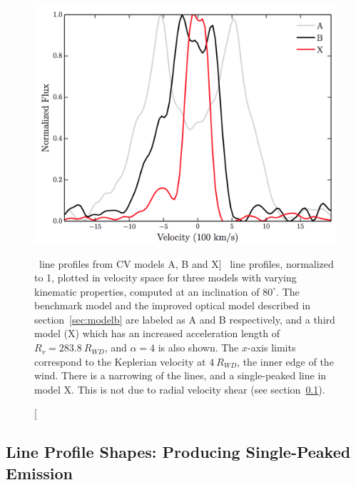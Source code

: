 \begin{figure}
\centering
\includegraphics[width=1.0\textwidth]{figures/05-cvpaper/mc.png}
\caption
[\ha\ line profiles from CV models A, B and X]
{
\ha\ line profiles, normalized to 1, plotted in velocity space 
for three models with varying kinematic 
properties, computed at an inclination of $80^\circ$.
The benchmark model and the improved optical
model described in section~\ref{sec:modelb} are labeled as A and B respectively,
and a third model (X) which has an increased acceleration length of 
$R_v = 283.8~R_{WD}$, and $\alpha=4$ is also shown. 
The $x$-axis limits correspond to the Keplerian velocity at 
$4~R_{WD}$, the inner edge of the wind.
There is a narrowing of the lines, and a single-peaked line in model X.
This is not due to radial velocity shear (see section~\ref{sec:cv_line_shapes}).
}
\label{halpha}
\end{figure} %






\subsection{Line Profile Shapes: Producing Single-Peaked Emission}
\label{sec:cv_line_shapes}

